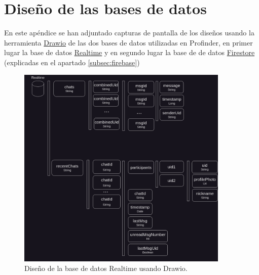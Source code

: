 \chapter{Diseño de las bases de datos}
\label{Appendix:bd_design}
En este apéndice se han adjuntado capturas de pantalla de los diseños usando la herramienta \hyperlink{subsec:drawio}{Drawio} de las dos bases de datos utilizadas en Profinder, en primer lugar la base de datos \hyperlink{subsec:realtime}{Realtime} y en segundo lugar la base de de datos \hyperlink{subsec:firestore}{Firestore} (explicadas en el apartado \ref{subsec:firebase})
\begin{figure}[ht]
	\centering
	\includegraphics[width = 0.9\textwidth]{Imagenes/drawio/realtime_db.jpg}
	\caption{Diseño de la base de datos Realtime usando Drawio.}
	\label{fig:realtime_db}
\end{figure}

